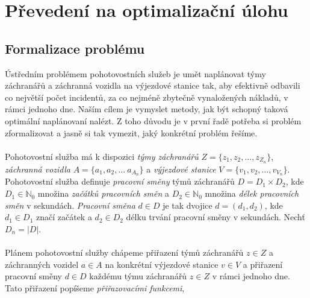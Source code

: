 \chapter{Převedení na optimalizační úlohu}

\section{Formalizace problému}

Ústředním problémem pohotovostních služeb je umět naplánovat týmy záchranářů a záchranná vozidla na výjezdové stanice tak, aby efektivně odbavili co největší počet incidentů,
za co nejméně zbytečně vynaložených nákladů, v rámci jednoho dne.
Naším cílem je vymyslet metody, jak být schopný taková optimální naplánovaní nalézt.
Z toho důvodu je v první řadě potřeba si problém zformalizovat a jasně si tak vymezit, jaký konkrétní problém řešíme.
\\
\\
Pohotovostní služba má k dispozici \textit{týmy záchranářů} $Z = \{ z_1, z_2, \dots, z_{Z_n} \}$, \textit{záchranná vozidla} $A = \{ a_1, a_2, \dots\ a_{A_n} \}$ a \textit{výjezdové stanice} $V = \{ v_1, v_2, \dots, v_{V_n} \}$.
Pohotovostní služba definuje \textit{pracovní směny} týmů záchranářů $D = D_{1} \times D_{2}$, 
kde $D_{1} \in \mathbb{N}_0$ množina \textit{začátků pracovních směn} a $D_{2} \in \mathbb{N}_0$ množina \textit{délek pracovních směn} v sekundách.
\textit{Pracovní směna} $d \in D$ je tak dvojice $d = (d_1, d_2)$, kde $d_{1} \in D_{1}$ značí začátek a $d_{2} \in D_{2}$ délku trvání pracovní směny v sekundách.
Nechť $D_n = |D|$.
\\
\\
Plánem pohotovostní služby chápeme přiřazení týmů záchranářů $z \in Z$ a záchranných vozidel $a \in A$ na konkrétní výjezdové stanice $v \in V$
a přiřazení pracovní směny $d \in D$ každému týmu záchranářů $z \in Z$ v rámci jednoho dne.
Tato přiřazení popíšeme \textit{přiřazovacími funkcemi}, 

